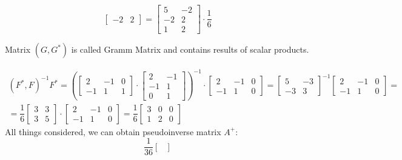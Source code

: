 \begin{solution}
\[\begin{bmatrix}
            -2 & 2
        \end{bmatrix} = \begin{bmatrix}
            5 & -2 \\
            -2 & 2\\
            1 & 2
        \end{bmatrix} \cdot \dfrac{1}{6}
    \]
    \begin{note}{}{}
        Matrix $(G, G^*)$ is called Gramm Matrix and contains results of scalar products. 
    \end{note}
    \begin{gather*}
        (F^*, F)^{-1}  F^* = \left(\begin{bmatrix}
            2 & -1 & 0\\
            -1 & 1 & 1
        \end{bmatrix} \cdot \begin{bmatrix}
            2 & -1 \\ -1 & 1 \\
            0 & 1
        \end{bmatrix}\right)^{-1}\cdot \begin{bmatrix}
            2 & -1 & 0\\
            -1 & 1 & 0
        \end{bmatrix} = \begin{bmatrix}
            5 & -3 \\
            -3 & 3
        \end{bmatrix}^{-1} \begin{bmatrix}
            2 & -1 & 0\\
            -1 & 1 & 0
        \end{bmatrix} = \\ = \dfrac{1}{6} \begin{bmatrix}
            3 & 3 \\
            3 & 5
        \end{bmatrix} \cdot \begin{bmatrix}
            2 & -1 & 0\\
            -1 & 1 & 0
        \end{bmatrix} = \dfrac{1}{6} \begin{bmatrix}
            3 & 0 & 0\\
            1 & 2 & 0
        \end{bmatrix}
    \end{gather*}
    All things considered, we can obtain pseudoinverse matrix $A^+$:
    \[
        \dfrac{1}{36} \begin{bmatrix}

\end{bmatrix}\]
\end{solution}
